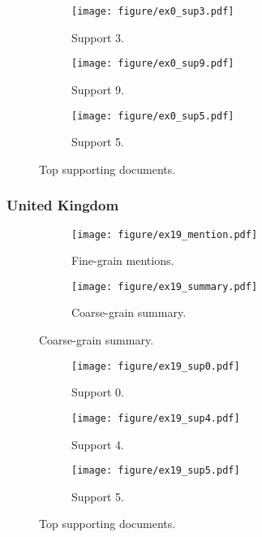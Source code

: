 \documentclass{article} \usepackage{iclr2019_conference,times}
\begin{document}
\begin{figure}[!h]
\begin{subfigure}{0.325\linewidth}
  \centering
  \caption{Support 3.}
  \texttt{[image: figure/ex0\_sup3.pdf]}
\end{subfigure}
\begin{subfigure}{0.325\linewidth}
  \centering
  \caption{Support 9.}
  \texttt{[image: figure/ex0\_sup9.pdf]}
\end{subfigure}
\begin{subfigure}{0.325\linewidth}
  \centering
  \caption{Support 5.}
  \texttt{[image: figure/ex0\_sup5.pdf]}
\end{subfigure}
\caption{Top supporting documents.}
\end{figure}



\clearpage

\subsubsection{United Kingdom}

\begin{figure}[!h]
\begin{subfigure}{0.59\linewidth}
  \centering
  \texttt{[image: figure/ex19\_mention.pdf]}
  \caption{Fine-grain mentions.}
\end{subfigure}
\begin{subfigure}{0.39\linewidth}
  \centering
  \texttt{[image: figure/ex19\_summary.pdf]}
  \caption{Coarse-grain summary.}
\end{subfigure}
\end{figure}


\begin{figure}[!h]
\begin{subfigure}{0.325\linewidth}
  \centering
  \caption{Support 0.}
  \texttt{[image: figure/ex19\_sup0.pdf]}
\end{subfigure}
\begin{subfigure}{0.325\linewidth}
  \centering
  \caption{Support 4.}
  \texttt{[image: figure/ex19\_sup4.pdf]}
\end{subfigure}
\begin{subfigure}{0.325\linewidth}
  \centering
  \caption{Support 5.}
  \texttt{[image: figure/ex19\_sup5.pdf]}
\end{subfigure}
\caption{Top supporting documents.}
\end{figure}
\end{document}
